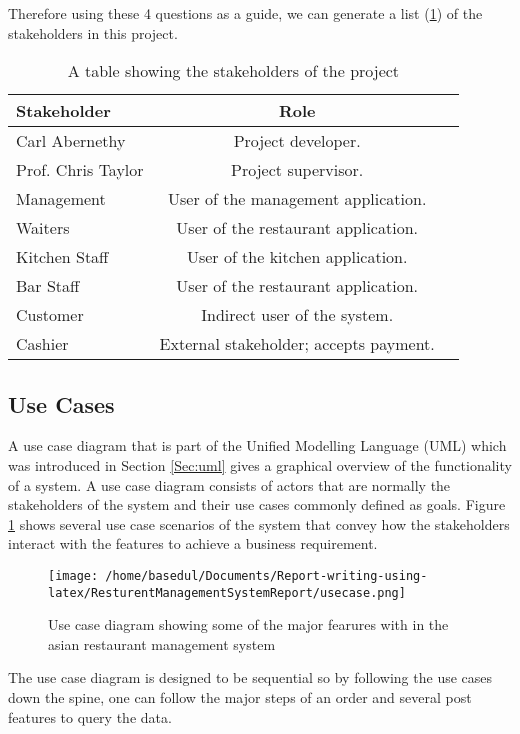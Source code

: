 \documentclass[12pt,a4paper]{article}
\begin{document}
Therefore using these 4 questions as a guide, we can generate a list (\ref{tab:stake}) of the stakeholders
in this project.
\begin{table}[H]
	\centering
	\caption{A table showing the stakeholders of the project}
	\label{tab:stake}
	\begin{tabular}{l c r}
		\bfseries{Stakeholder} & \bfseries{Role}\\ \hline
		Carl Abernethy & Project developer.\\
		Prof. Chris Taylor & Project supervisor.\\
		Management & User of the management application.\\
		Waiters & User of the restaurant application.\\
		Kitchen Staff & User of the kitchen application.\\
		Bar Staff & User of the restaurant application.\\
		Customer & Indirect user of the system.\\
		Cashier & External stakeholder; accepts payment.\\
	\end{tabular}
\end{table}

\subsection{Use Cases}
	A use case diagram that is part of the Unified Modelling Language (UML) which was introduced in
Section \ref{Sec:uml} gives a graphical overview of the functionality of a system. A use case diagram consists of
actors that are normally the stakeholders of the system and their use cases commonly defined as goals.
Figure \ref{fig:usecase} shows several use case scenarios of the system that convey how the stakeholders interact
with the features to achieve a business requirement.
\begin{figure}[H]
		\centering
		\texttt{[image: /home/basedul/Documents/Report-writing-using-latex/ResturentManagementSystemReport/usecase.png]}
		\caption{Use case diagram showing some of the major fearures with in the asian restaurant management system}
		\label{fig:usecase} 
	\end{figure}

The use case diagram is designed to be sequential so by following the use cases down the spine, one
can follow the major steps of an order and several post features to query the data.
\end{document}
